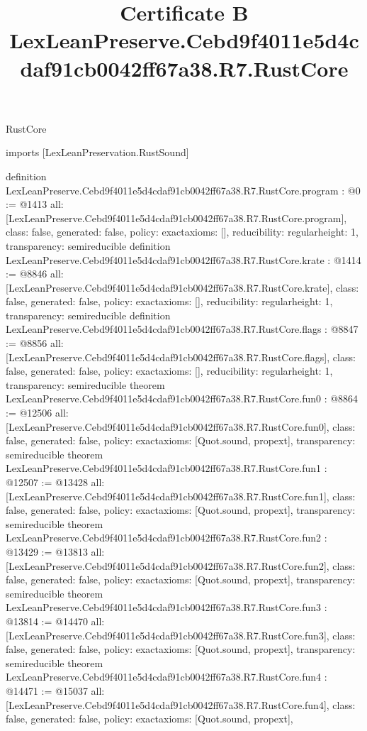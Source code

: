 \begin{lexlean}{RustCore}
\title{Certificate B LexLeanPreserve.Cebd9f4011e5d4cdaf91cb0042ff67a38.R7.RustCore}
\begin{coremodule}
imports [LexLeanPreservation.RustSound]

definition LexLeanPreserve.Cebd9f4011e5d4cdaf91cb0042ff67a38.R7.RustCore.program : @0 := @1413 {
  all: [LexLeanPreserve.Cebd9f4011e5d4cdaf91cb0042ff67a38.R7.RustCore.program],
  class: false,
  generated: false,
  policy: exact{axioms: []},
  reducibility: regular{height: 1},
  transparency: semireducible
}
definition LexLeanPreserve.Cebd9f4011e5d4cdaf91cb0042ff67a38.R7.RustCore.krate : @1414 := @8846 {
  all: [LexLeanPreserve.Cebd9f4011e5d4cdaf91cb0042ff67a38.R7.RustCore.krate],
  class: false,
  generated: false,
  policy: exact{axioms: []},
  reducibility: regular{height: 1},
  transparency: semireducible
}
definition LexLeanPreserve.Cebd9f4011e5d4cdaf91cb0042ff67a38.R7.RustCore.flags : @8847 := @8856 {
  all: [LexLeanPreserve.Cebd9f4011e5d4cdaf91cb0042ff67a38.R7.RustCore.flags],
  class: false,
  generated: false,
  policy: exact{axioms: []},
  reducibility: regular{height: 1},
  transparency: semireducible
}
theorem LexLeanPreserve.Cebd9f4011e5d4cdaf91cb0042ff67a38.R7.RustCore.fun0 : @8864 := @12506 {
  all: [LexLeanPreserve.Cebd9f4011e5d4cdaf91cb0042ff67a38.R7.RustCore.fun0],
  class: false,
  generated: false,
  policy: exact{axioms: [Quot.sound, propext]},
  transparency: semireducible
}
theorem LexLeanPreserve.Cebd9f4011e5d4cdaf91cb0042ff67a38.R7.RustCore.fun1 : @12507 := @13428 {
  all: [LexLeanPreserve.Cebd9f4011e5d4cdaf91cb0042ff67a38.R7.RustCore.fun1],
  class: false,
  generated: false,
  policy: exact{axioms: [Quot.sound, propext]},
  transparency: semireducible
}
theorem LexLeanPreserve.Cebd9f4011e5d4cdaf91cb0042ff67a38.R7.RustCore.fun2 : @13429 := @13813 {
  all: [LexLeanPreserve.Cebd9f4011e5d4cdaf91cb0042ff67a38.R7.RustCore.fun2],
  class: false,
  generated: false,
  policy: exact{axioms: [Quot.sound, propext]},
  transparency: semireducible
}
theorem LexLeanPreserve.Cebd9f4011e5d4cdaf91cb0042ff67a38.R7.RustCore.fun3 : @13814 := @14470 {
  all: [LexLeanPreserve.Cebd9f4011e5d4cdaf91cb0042ff67a38.R7.RustCore.fun3],
  class: false,
  generated: false,
  policy: exact{axioms: [Quot.sound, propext]},
  transparency: semireducible
}
theorem LexLeanPreserve.Cebd9f4011e5d4cdaf91cb0042ff67a38.R7.RustCore.fun4 : @14471 := @15037 {
  all: [LexLeanPreserve.Cebd9f4011e5d4cdaf91cb0042ff67a38.R7.RustCore.fun4],
  class: false,
  generated: false,
  policy: exact{axioms: [Quot.sound, propext]},
}
\end{coremodule}
\end{lexlean}
